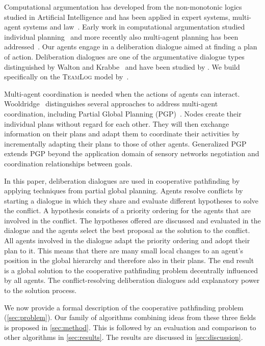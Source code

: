 Computational argumentation has developed from the non-monotonic logics studied 
in Artificial Intelligence and has been applied in expert 
systems, multi-agent systems and law~\cite{vanEemerenEtal2014ch11}. Early work in 
computational argumentation studied individual planning~\cite{pollock1995} and 
more recently also multi-agent planning has been 
addressed~\cite{ferrando2012,pardo2011}. Our agents engage in a deliberation 
dialogue aimed at finding a plan of action. Deliberation dialogues are one of 
the argumentative dialogue types distinguished by Walton and 
Krabbe~ and have been studied by 
\cite{mcburney2007,walton2014}. We build specifically on the \textsc{TeamLog} model by~.

Multi-agent coordination is needed when the actions of agents can interact.
Wooldridge~ distinguishes several 
approaches to address multi-agent coordination, including Partial Global 
Planning (PGP)~\cite{durfee1991}. Nodes create their individual plans without 
regard for each other. They will then exchange information on their plans and
adapt them to coordinate their activities by incrementally 
adapting their plans to those of other agents.
Generalized PGP \cite{decker1992} extends PGP beyond the application domain of sensory networks %
negotiation and coordination relationships between goals. 

In this paper, deliberation dialogues are used in cooperative pathfinding by applying techniques from
partial global planning. Agents resolve conflicts by starting a dialogue in
which they share and evaluate different hypotheses to solve the conflict. A
hypothesis consists of a priority ordering for the agents that are involved in
the conflict. The hypotheses offered are discussed and evaluated in the
dialogue and the agents select the best proposal as the solution
to the conflict. All agents involved in the dialogue adapt the priority
ordering and adopt their plan to it. This means that there are many small local
changes to an agent's position in the global hierarchy and therefore also in
their plans. The end result is a global solution to the cooperative pathfinding
problem decentrally influenced by all agents. The conflict-resolving deliberation dialogues add explanatory power to the solution process.

We now provide a formal description of the cooperative pathfinding problem 
(\autoref{sec:problem}). Our family 
of algorithms combining ideas from these three fields is proposed in 
\autoref{sec:method}. This is followed by an evaluation and comparison to other 
algorithms in \autoref{sec:results}. The results are discussed in 
\autoref{sec:discussion}.
